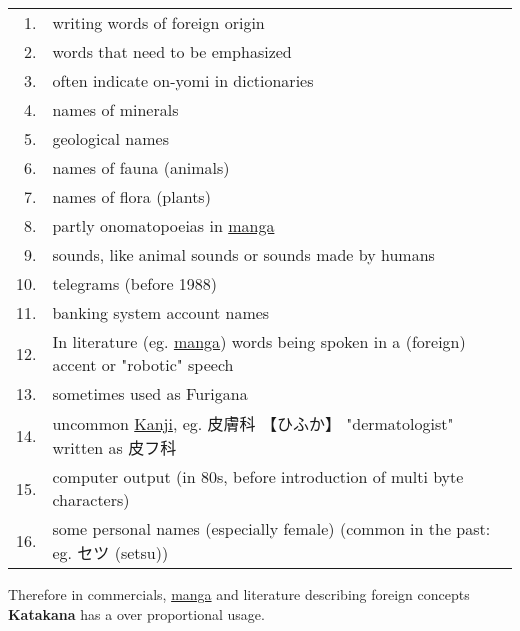 \begin{tabular}{rp{15cm}}
1.& writing words of foreign origin\\
2.& words that need to be emphasized\\
3. &often indicate on-yomi in dictionaries\\
4.& names of minerals \\
5.& geological names \\
6.& names of fauna (animals)\\
7.& names of flora (plants)\\
8.& partly onomatopoeias in \hyperref[sec:Manga]{manga}\\
9.& sounds, like animal sounds or sounds made by humans\\
10.& telegrams (before 1988)\\
11.& banking system account names\\
12.& In literature (eg. \hyperref[sec:Manga]{manga}) words being spoken in a
(foreign) accent or "robotic" speech\\
13. &sometimes used as Furigana\\
14. & uncommon \hyperref[sec:Kanji]{Kanji}, eg. {皮膚科} {【ひふか】} 
"dermatologist" written as {皮フ科}\\
15.& computer output (in 80s, before introduction of multi byte characters)\\
16. &some personal names (especially female) (common in the past: eg.
セツ (setsu))\\

\end{tabular}

\medskip


Therefore in commercials, \hyperref[sec:Manga]{manga} and literature describing
foreign concepts \textbf{Katakana} has a over proportional usage.



%

